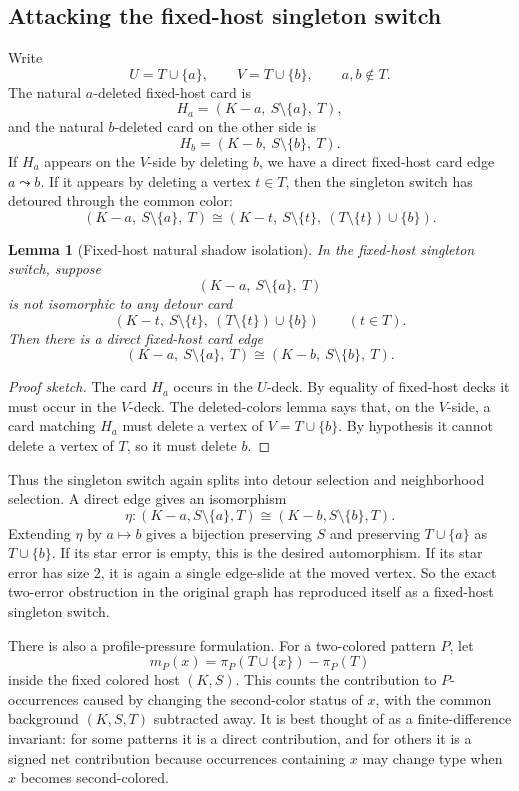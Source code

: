 \documentclass[11pt]{article}
\newtheorem{lemma}{Lemma}
\begin{document}
\subsection{Attacking the fixed-host singleton switch}

Write
\[
  U=T\cup\{a\},
  \qquad
  V=T\cup\{b\},
  \qquad
  a,b\notin T.
\]
The natural \(a\)-deleted fixed-host card is
\[
  H_a=(K-a,\ S\setminus\{a\},\ T),
\]
and the natural \(b\)-deleted card on the other side is
\[
  H_b=(K-b,\ S\setminus\{b\},\ T).
\]
If \(H_a\) appears on the \(V\)-side by deleting \(b\), we have a direct
fixed-host card edge \(a\leadsto b\).  If it appears by deleting a vertex
\(t\in T\), then the singleton switch has detoured through the common color:
\[
  (K-a,\ S\setminus\{a\},\ T)
  \cong
  (K-t,\ S\setminus\{t\},\ (T\setminus\{t\})\cup\{b\}).
\]

\begin{lemma}[Fixed-host natural shadow isolation]
In the fixed-host singleton switch, suppose
\[
  (K-a,\ S\setminus\{a\},\ T)
\]
is not isomorphic to any detour card
\[
  (K-t,\ S\setminus\{t\},\ (T\setminus\{t\})\cup\{b\})
  \qquad (t\in T).
\]
Then there is a direct fixed-host card edge
\[
  (K-a,\ S\setminus\{a\},\ T)
  \cong
  (K-b,\ S\setminus\{b\},\ T).
\]
\end{lemma}

\begin{proof}[Proof sketch]
The card \(H_a\) occurs in the \(U\)-deck.  By equality of fixed-host decks it
must occur in the \(V\)-deck.  The deleted-colors lemma says that, on the
\(V\)-side, a card matching \(H_a\) must delete a vertex of \(V=T\cup\{b\}\).
By hypothesis it cannot delete a vertex of \(T\), so it must delete \(b\).
\end{proof}

Thus the singleton switch again splits into detour selection and neighborhood
selection.  A direct edge gives an isomorphism
\[
  \eta:(K-a,S\setminus\{a\},T)
  \cong
  (K-b,S\setminus\{b\},T).
\]
Extending \(\eta\) by \(a\mapsto b\) gives a bijection preserving \(S\) and
preserving \(T\cup\{a\}\) as \(T\cup\{b\}\).  If its star error is empty, this
is the desired automorphism.  If its star error has size \(2\), it is again a
single edge-slide at the moved vertex.  So the exact two-error obstruction in
the original graph has reproduced itself as a fixed-host singleton switch.

There is also a profile-pressure formulation.  For a two-colored pattern
\(P\), let
\[
  m_P(x)=\pi_P(T\cup\{x\})-\pi_P(T)
\]
inside the fixed colored host \((K,S)\).  This counts the contribution to
\(P\)-occurrences caused by changing the second-color status of \(x\), with
the common background \((K,S,T)\) subtracted away.  It is best thought of as a
finite-difference invariant: for some patterns it is a direct contribution,
and for others it is a signed net contribution because occurrences containing
\(x\) may change type when \(x\) becomes second-colored.
\end{document}
